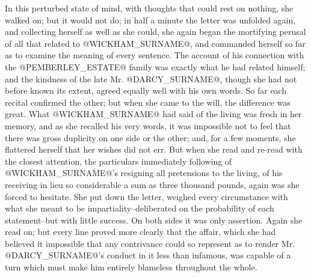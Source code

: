 In this perturbed state of mind, with thoughts that could rest on
nothing, she walked on; but it would not do; in half a minute the letter
was unfolded again, and collecting herself as well as she could, she
again began the mortifying perusal of all that related to @WICKHAM_SURNAME@, and
commanded herself so far as to examine the meaning of every sentence.
The account of his connection with the @PEMBERLEY_ESTATE@ family was exactly what
he had related himself; and the kindness of the late Mr. @DARCY_SURNAME@, though
she had not before known its extent, agreed equally well with his own
words. So far each recital confirmed the other; but when she came to the
will, the difference was great. What @WICKHAM_SURNAME@ had said of the living
was fresh in her memory, and as she recalled his very words, it was
impossible not to feel that there was gross duplicity on one side or the
other; and, for a few moments, she flattered herself that her wishes did
not err. But when she read and re-read with the closest attention, the
particulars immediately following of @WICKHAM_SURNAME@'s resigning all pretensions
to the living, of his receiving in lieu so considerable a sum as three
thousand pounds, again was she forced to hesitate. She put down
the letter, weighed every circumstance with what she meant to be
impartiality--deliberated on the probability of each statement--but with
little success. On both sides it was only assertion. Again she read
on; but every line proved more clearly that the affair, which she had
believed it impossible that any contrivance could so represent as to
render Mr. @DARCY_SURNAME@'s conduct in it less than infamous, was capable of a
turn which must make him entirely blameless throughout the whole.

